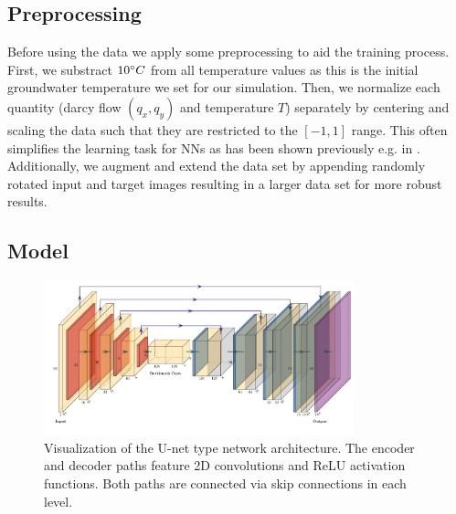 \documentclass{article} %
\begin{document}

\subsection*{Preprocessing}
Before using the data we apply some preprocessing to aid the training process.
First, we substract $10 \degree C$ from all temperature values as this is the initial groundwater temperature we set for our simulation.
Then, we normalize each quantity (darcy flow $(q_x, q_y)$ and temperature $T$) separately by centering and scaling the data such that they are restricted to the $[-1, 1]$ range.
This often simplifies the learning task for NNs as has been shown previously e.g. in \citep{LeCun2012,Wiesler2011}.
Additionally, we augment and extend the data set by appending randomly rotated input and target images resulting in a larger data set for more robust results.


\subsection*{Model}
\begin{figure}[!htb]
   \centering
   \includegraphics[width=0.8\textwidth]{img/arch.pdf}
   \caption{Visualization of the U-net type network architecture. The encoder and decoder paths feature 2D convolutions and ReLU activation functions. Both paths are connected via skip connections in each level.}
   \label{fig:arch}
\end{figure}
\end{document}
